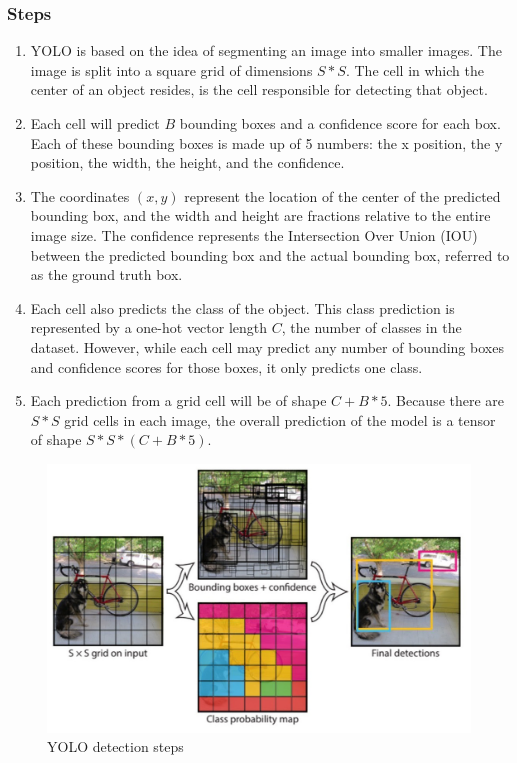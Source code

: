 \subsubsection{Steps}
\begin{enumerate}
	\item YOLO is based on the idea of segmenting an image into smaller images. The image is split into a square grid of dimensions $S*S$. The cell in which the center of an object resides, is the cell responsible for detecting that object. 
	
	\item Each cell will predict $B$ bounding boxes and a confidence score for each box. Each of these bounding boxes is made up of 5 numbers: the x position, the y position, the width, the height, and the confidence. 
	
	\item The coordinates $(x, y)$ represent the location of the center of the predicted bounding box, and the width and height are fractions relative to the entire image size. The confidence represents the Intersection Over Union (IOU) between the predicted bounding box and the actual bounding box, referred to as the ground truth box. 
	
	\item Each cell also predicts the class of the object. This class prediction is represented by a one-hot vector length $C$, the number of classes in the dataset. However, while each cell may predict any number of bounding boxes and confidence scores for those boxes, it only predicts one class. 
	
	\item Each prediction from a grid cell will be of shape $C + B * 5$. Because there are $S*S$ grid cells in each image, the overall prediction of the model is a tensor of shape $S*S*(C+B*5)$.
\end{enumerate}
\begin{figure}[h!]
	\centering
	\includegraphics[width=0.7\linewidth]{Images/yolo_steps}
	\caption{YOLO detection steps}
\end{figure}


